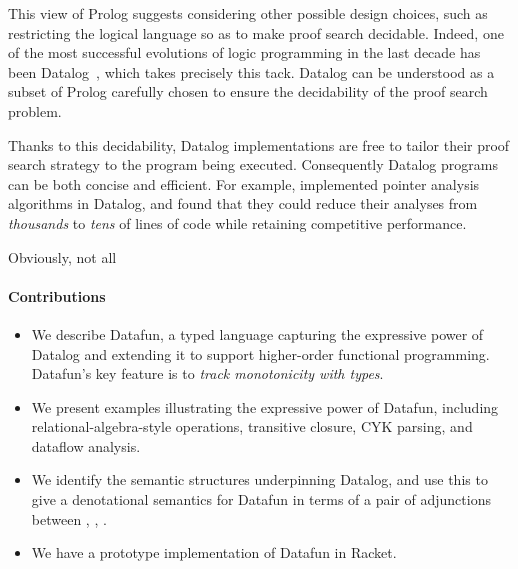 
This view of Prolog suggests considering other possible design
choices, such as restricting the logical language so as to make proof
search decidable. Indeed, one of the most successful evolutions of
logic programming in the last decade has been Datalog~\cite{datalog},
which takes precisely this tack. Datalog can be understood as a subset
of Prolog carefully chosen to ensure the decidability of the proof
search problem.




Thanks to this decidability, Datalog implementations are free to
tailor their proof search strategy to the program being executed.
Consequently Datalog programs can be both concise and efficient. For
example, \citet{whaley-lam} implemented pointer analysis algorithms in
Datalog, and found that they could reduce their analyses from
\emph{thousands} to \emph{tens} of lines of code while retaining
competitive performance.

Obviously, not all 











\paragraph{Contributions}
\begin{itemize}
\item We describe Datafun, a typed language capturing the expressive power of
  Datalog and extending it to support higher-order functional programming.
  Datafun's key feature is to \emph{track monotonicity with types}.

\item We present examples illustrating the expressive power of Datafun,
  including relational-algebra-style operations, transitive closure, CYK
  parsing, and dataflow analysis.

\item We identify the semantic structures underpinning Datalog, and use this to
  give a denotational semantics for Datafun in terms of a pair of adjunctions
  between \cSet{}, \cPoset{}, \cSL{}.

\item We have a prototype implementation of Datafun in Racket. 
\end{itemize}

